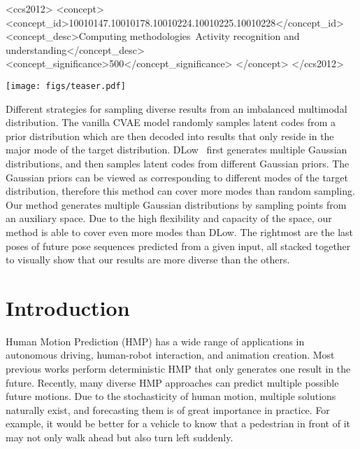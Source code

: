 \documentclass[sigconf,screen,nonacm]{acmart}
\begin{document}
	\begin{CCSXML}
		<ccs2012>
		<concept>
		<concept_id>10010147.10010178.10010224.10010225.10010228</concept_id>
		<concept_desc>Computing methodologies~Activity recognition and understanding</concept_desc>
		<concept_significance>500</concept_significance>
		</concept>
		</ccs2012>
	\end{CCSXML}
	
	


	
	
\begin{teaserfigure}
		\centering
		\texttt{[image: figs/teaser.pdf]} \caption{Different strategies for sampling diverse results from an imbalanced multimodal distribution. The vanilla CVAE model randomly samples latent codes from a prior distribution which are then decoded into results that only reside in the major mode of the target distribution. DLow~\cite{yuan2020dlow} first generates multiple Gaussian distributions, and then samples latent codes from different Gaussian priors. The Gaussian priors can be viewed as corresponding to different modes of the target distribution, therefore this method can cover more modes than random sampling. Our method generates multiple Gaussian distributions by sampling points from an auxiliary space. Due to the high flexibility and capacity of the space, our method is able to cover even more modes than DLow. The rightmost are the last poses of future pose sequences predicted from a given input, all stacked together to visually show that our results are more diverse than the others.}
\label{fig:teaser}
	\end{teaserfigure}
	
	
	\maketitle
	
	\section{Introduction}
	Human Motion Prediction (HMP) has a wide range of applications in autonomous driving, human-robot interaction, and animation creation. Most previous works \cite{martinez2017human, song2017end, sang2020human, chiu2019action, corona2020context, aksan2019structured, li2017auto, fragkiadaki2015recurrent, liu2022investigating,mao2019learning, mao2020history, li2020dynamic, li2021symbiotic, cui2020learning, dang2021msr, cui2021towards, li2020multitask, liu2021motion, aksan2021spatio, martinez2021pose, aksan2020attention, cai2020learning, su2021motion, Ma_2022_CVPR} perform deterministic HMP that only generates one result in the future. Recently, many diverse HMP approaches can predict multiple possible future motions. Due to the stochasticity of human motion, multiple solutions naturally exist, and forecasting them is of great importance in practice. For example, it would be better for a vehicle to know that a pedestrian in front of it may not only walk ahead but also turn left suddenly. 
	
\end{document}
